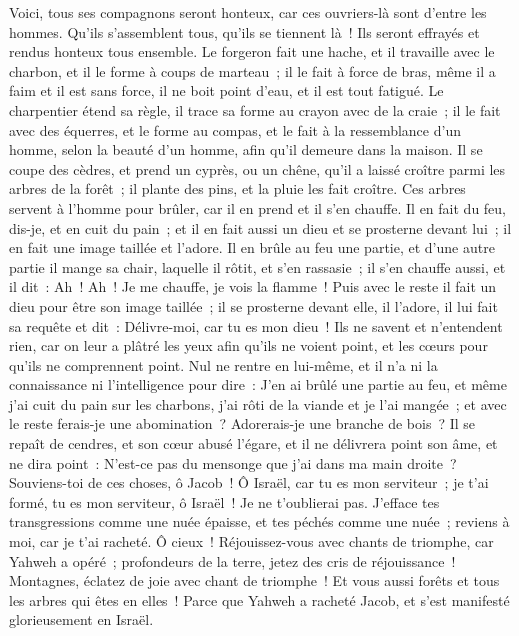 \begin{multicols}{2}
Voici, tous ses compagnons seront honteux, car ces ouvriers-là sont d'entre les hommes. Qu'ils s'assemblent tous, qu'ils se tiennent là~! Ils seront effrayés et rendus honteux tous ensemble.
Le forgeron fait une hache, et il travaille avec le charbon, et il le forme à coups de marteau~; il le fait à force de bras, même il a faim et il est sans force, il ne boit point d'eau, et il est tout fatigué.
Le charpentier étend sa règle, il trace sa forme au crayon avec de la craie~; il le fait avec des équerres, et le forme au compas, et le fait à la ressemblance d'un homme, selon la beauté d'un homme, afin qu'il demeure dans la maison.
Il se coupe des cèdres, et prend un cyprès, ou un chêne, qu'il a laissé croître parmi les arbres de la forêt~; il plante des pins, et la pluie les fait croître.
Ces arbres servent à l'homme pour brûler, car il en prend et il s'en chauffe. Il en fait du feu, dis-je, et en cuit du pain~; et il en fait aussi un dieu et se prosterne devant lui~; il en fait une image taillée et l'adore.
Il en brûle au feu une partie, et d'une autre partie il mange sa chair, laquelle il rôtit, et s'en rassasie~; il s'en chauffe aussi, et il dit~: Ah~! Ah~! Je me chauffe, je vois la flamme~!
Puis avec le reste il fait un dieu pour être son image taillée~; il se prosterne devant elle, il l'adore, il lui fait sa requête et dit~: Délivre-moi, car tu es mon dieu~!
Ils ne savent et n'entendent rien, car on leur a plâtré les yeux afin qu'ils ne voient point, et les cœurs pour qu'ils ne comprennent point.
Nul ne rentre en lui-même, et il n'a ni la connaissance ni l'intelligence pour dire~: J'en ai brûlé une partie au feu, et même j'ai cuit du pain sur les charbons, j'ai rôti de la viande et je l'ai mangée~; et avec le reste ferais-je une abomination~? Adorerais-je une branche de bois~?
Il se repaît de cendres, et son cœur abusé l'égare, et il ne délivrera point son âme, et ne dira point~: N'est-ce pas du mensonge que j'ai dans ma main droite~?
Souviens-toi de ces choses, ô Jacob~! Ô Israël, car tu es mon serviteur~; je t'ai formé, tu es mon serviteur, ô Israël~! Je ne t'oublierai pas.
J'efface tes transgressions comme une nuée épaisse, et tes péchés comme une nuée~; reviens à moi, car je t'ai racheté.
Ô cieux~! Réjouissez-vous avec chants de triomphe, car Yahweh a opéré~; profondeurs de la terre, jetez des cris de réjouissance~! Montagnes, éclatez de joie avec chant de triomphe~! Et vous aussi forêts et tous les arbres qui êtes en elles~! Parce que Yahweh a racheté Jacob, et s'est manifesté glorieusement en Israël.

\end{multicols}
